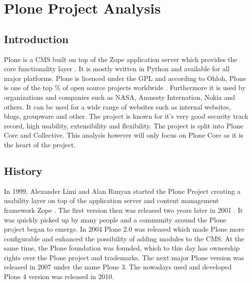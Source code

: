 \section{Plone Project Analysis} %
\label{sec:Plone Project Analysis}


\subsection{Introduction} %
\label{sub:Introduction}

Plone is a \ac{CMS} built on top of the Zope application server which provides
the core functionality layer \cite{Aspeli2005,PloneFaq,PloneWhatIsPlone}. It is
mostly written in Python and available for all major platforms. Plone is
licenced under the \ac{GPL} and according to Ohloh, Plone is one of the top
\unit[2]{\%} of open source projects worldwide \cite{PloneOhlohFactoids}.
Furthermore it is used by organizations and companies such as NASA, Amnesty
Internation, Nokia and others. It can be used for a wide range of websites such
as internal websites, blogs, groupware and other. The project is known for it's
very good security track record, high usability, extensibility and flexibility.
The project is split into Plone Core and Collective. This analysis however will
only focus on Plone Core as it is the heart of the project.


\subsection{History} %
\label{sub:History}

In 1999, Alexander Limi and Alan Runyan started the Plone Project creating a
usability layer on top of the application server and content management
framework Zope \cite{Aspeli2005,PloneFaq}. The first version then was released
two years later in 2001 \cite{PloneReleases}. It was quickly picked up by many
people and a community around the Plone project began to emerge. In 2004 Plone
2.0 was released which made Plone more configurable and enhanced the
possibility of adding modules to the \ac{CMS}. At the same time, the Plone
foundation was founded, which to this day has ownership rights over the Plone
project and trademarks. The next major Plone version was released in 2007 under
the name Plone 3. The nowadays used and developed Plone 4 version was released
in 2010.

